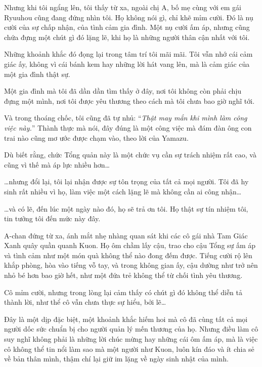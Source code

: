 \documentclass[../main.tex]{subfiles}
\begin{document}
Nhưng khi tôi ngẩng lên, tôi thấy từ xa, ngoài chị A, bố mẹ cùng với em gái Ryuuhou cũng đang đứng nhìn tôi. Họ không nói gì, chỉ khẽ mỉm cười. Đó là nụ cười của sự chấp nhận, của tình cảm gia đình. Một nụ cười ấm áp, nhưng cũng chứa đựng một chút gì đó lặng lẽ, khi họ là những người thân cận nhất với tôi.

Những khoảnh khắc đó đọng lại trong tâm trí tôi mãi mãi. Tôi vẫn nhớ cái cảm giác ấy, không vì cái bánh kem hay những lời hát vang lên, mà là cảm giác của một gia đình thật sự.

Một gia đình mà tôi đã dần dần tìm thấy ở đây, nơi tôi không còn phải chịu đựng một mình, nơi tôi được yêu thương theo cách mà tôi chưa bao giờ nghĩ tới.

Và trong thoáng chốc, tôi cũng đã tự nhủ: ``\textit{Thật may mắn khi mình làm công việc này.}'' Thành thực mà nói, đây đúng là một công việc mà đám đàn ông con trai nào cũng mơ ước được chạm vào, theo lời của Yamazu.

Dù biết rằng, chức Tổng quản này là một chức vụ cần sự trách nhiệm rất cao, và cũng vì thế mà áp lực nhiều hơn\dots

\dots nhưng đổi lại, tôi lại nhận được sự tôn trọng của tất cả mọi người. Tôi đã hy sinh rất nhiều vì họ, làm việc một cách lặng lẽ mà không cần ai công nhận\dots

\dots và có lẽ, đến lúc một ngày nào đó, họ sẽ trả ơn tôi. Họ thật sự tín nhiệm tôi, tin tưởng tôi đến mức này đây.

\pov{-}

A-chan đứng từ xa, ánh mắt nhẹ nhàng quan sát khi các cô gái nhà Tam Giác Xanh quây quần quanh Kuon. Họ ôm chầm lấy cậu, trao cho cậu Tổng sự ấm áp và tình cảm như một món quà không thể nào đong đếm được. Tiếng cười rộ lên khắp phòng, hòa vào tiếng vỗ tay, và trong không gian ấy, cậu dường như trở nên nhỏ bé hơn bao giờ hết, như một đứa trẻ không thể từ chối tình yêu thương.

Cô mỉm cười, nhưng trong lòng lại cảm thấy có chút gì đó không thể diễn tả thành lời, như thể cô vẫn chưa thực sự hiểu, bởi lẽ\dots\

Đây là một dịp đặc biệt, một khoảnh khắc hiếm hoi mà cô đã cùng tất cả mọi người dốc sức chuẩn bị cho người quản lý mến thương của họ. Nhưng điều làm cô suy nghĩ không phải là những lời chúc mừng hay những cái ôm ấm áp, mà là việc cô không thể tin nổi làm sao mà một người như Kuon, luôn kín đáo và ít chia sẻ về bản thân mình, thậm chí lại giữ im lặng về ngày sinh nhật của mình.
\end{document}
